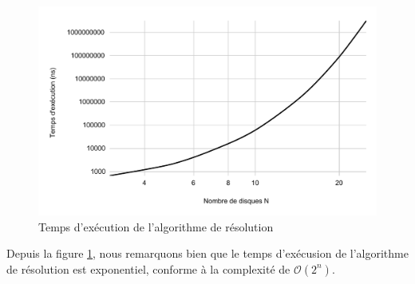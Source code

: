 \begin{figure}[H]
    \centering
        \includegraphics[scale=0.6]{./ressources/temps_execution_algo_reso.pdf}
        \caption{Temps d'exécution de l'algorithme de résolution}
    \label{fig:temps_exec_algo_reso}
\end{figure}
\par
Depuis la figure \ref{fig:temps_exec_algo_reso}, nous remarquons bien que le temps d'exécusion de l'algorithme de résolution est exponentiel, conforme à la complexité de $\mathcal{O}(2^{n})$.

